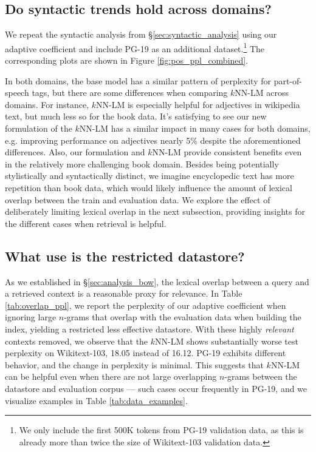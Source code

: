 \documentclass[11pt]{article}
\begin{document}
\subsection{Do syntactic trends hold across domains?}

We repeat the syntactic analysis from \S\ref{sec:syntactic_analysis} using our adaptive coefficient and include PG-19 as an additional dataset.\footnote{We only include the first 500K tokens from PG-19 validation data, as this is already more than twice the size of Wikitext-103 validation data.} The corresponding plots are shown in Figure \ref{fig:pos_ppl_combined}.

In both domains, the base model has a similar pattern of perplexity for part-of-speech tags, but there are some differences when comparing $k$NN-LM across domains. For instance, $k$NN-LM is especially helpful for adjectives in wikipedia text, but much less so for the book data. It's satisfying to see our new formulation of the $k$NN-LM has a similar impact in many cases for both domains, e.g. improving performance on adjectives nearly 5\% despite the aforementioned differences. Also, our formulation and $k$NN-LM provide consistent benefits even in the relatively more challenging book domain. Besides being potentially stylistically and syntactically distinct, we imagine encyclopedic text has more repetition than book data, which would likely influence the amount of lexical overlap between the train and evaluation data. We explore the effect of deliberately limiting lexical overlap in the next subsection, providing insights for the different cases when retrieval is helpful.

\subsection{What use is the restricted datastore?}


As we established in \S\ref{sec:analysis_bow}, the lexical overlap between a query and a retrieved context is a reasonable proxy for relevance. In Table \ref{tab:overlap_ppl}, we report the perplexity of our adaptive coefficient when ignoring large $n$-grams that overlap with the evaluation data when building the index, yielding a restricted less effective datastore. With these highly \textit{relevant} contexts removed, we observe that the $k$NN-LM shows substantially worse test perplexity on Wikitext-103, 18.05 instead of 16.12. PG-19 exhibits different behavior, and the change in perplexity is minimal. This suggests that $k$NN-LM can be helpful even when there are not large overlapping $n$-grams between the datastore and evaluation corpus --- such cases occur frequently in PG-19, and we visualize examples in Table \ref{tab:data_examples}.
\end{document}
